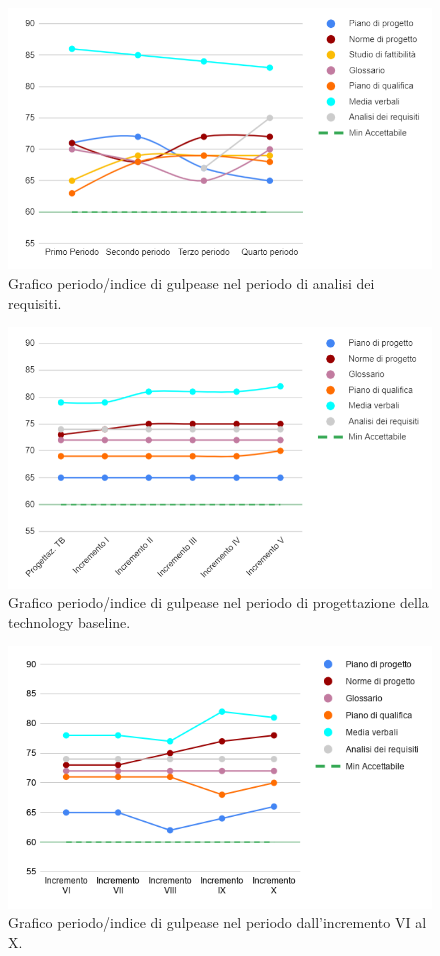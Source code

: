 \begin{figure}[H]
	\centering
	\includegraphics[width=0.8\linewidth]{./res/images/gulpease_1.png}
	\caption{Grafico periodo/indice di gulpease nel periodo di analisi dei requisiti.}
	\label{fig:Grafico indice di gulpease periodo di analisi dei requisiti.}
\end{figure}

\begin{figure}[H]
	\centering
	\includegraphics[width=0.8\linewidth]{./res/images/gulpease_2.png}
	\caption{Grafico periodo/indice di gulpease nel periodo di progettazione della technology baseline.}
	\label{fig:Grafico indice di gulpease periodo di progettazione della technology baseline.}
\end{figure}

\begin{figure}[H]
	\centering
	\includegraphics[width=0.8\linewidth]{./res/images/gulpease_3.png}
	\caption{Grafico periodo/indice di gulpease nel periodo dall'incremento VI al X.}
	\label{fig:Grafico indice di gulpease periodo dall'incremento VI al X.}
\end{figure}

